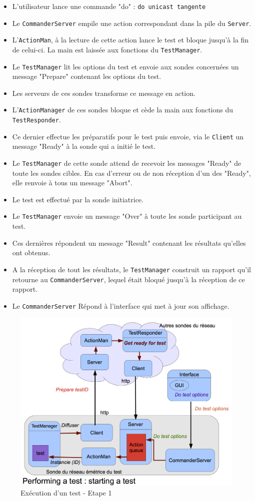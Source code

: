 \documentclass[a4paper,11pt]{article}
\begin{document}
\begin{itemize}
\item L'utilisateur lance une commande "do" : \texttt{do unicast tangente}
\item Le \texttt{CommanderServer} empile une action correspondant dans la pile du \texttt{Server}.
\item L'\texttt{ActionMan}, à la lecture de cette action lance le test et bloque jusqu'à la fin de celui-ci. La main est laissée aux fonctions du \texttt{TestManager}.
\item Le \texttt{TestManager} lit les options du test et envoie aux sondes concernées un message "Prepare" contenant les options du test.
\item Les serveurs de ces sondes transforme ce message en action.
\item L'\texttt{ActionManager} de ces sondes bloque et cède la main aux fonctions du \texttt{TestResponder}.
\item Ce dernier effectue les préparatifs pour le test puis envoie, via le \texttt{Client} un message "Ready" à la sonde qui a initié le test.
\item Le \texttt{TestManager} de cette sonde attend de recevoir les messages "Ready" de toute les sondes cibles. En cas d'erreur ou de non réception d'un des "Ready", elle renvoie à tous un message "Abort".
\item Le test est effectué par la sonde initiatrice.
\item Le \texttt{TestManager} envoie un message "Over" à toute les sonde participant au test.
\item Ces dernières répondent un message "Result" contenant les résultats qu'elles ont obtenus.
\item A la réception de tout les résultats, le \texttt{TestManager} construit un rapport qu'il retourne au \texttt{CommanderServer}, lequel était bloqué jusqu'à la réception de ce rapport.
\item Le \texttt{CommanderServer} Répond à l'interface qui met à jour son affichage.
\end{itemize}


\begin{figure}[!ht]
\centering\includegraphics[width=0.8\linewidth]{img/graphTest1.png}
\caption{Exécution d'un test - Etape 1}
\end{figure}
\end{document}
